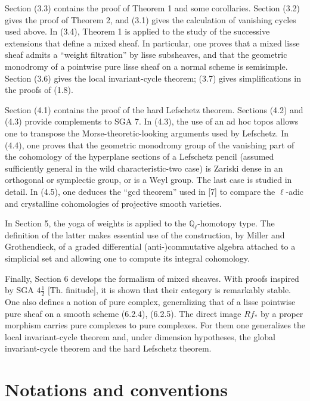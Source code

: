 \documentclass[11pt]{article}
\theoremstyle{remark}
\newcommand{\Ql}{\mathbb{Q}_\ell}
\begin{document}
Section (3.3) contains the proof of Theorem 1 and some corollaries. Section (3.2) gives the proof of Theorem 2, and (3.1) gives the calculation of vanishing cycles used above. In (3.4), Theorem 1 is applied to the study of the successive extensions that define a mixed sheaf. In particular, one proves that a mixed lisse sheaf admits a ``weight filtration'' by lisse subsheaves, and that the geometric monodromy of a pointwise pure lisse sheaf on a normal scheme is semisimple. Section (3.6) gives the local invariant-cycle theorem; (3.7) gives simplifications in the proofs of (1.8).

Section (4.1) contains the proof of the hard Lefschetz theorem. Sections (4.2) and (4.3) provide complements to SGA 7. In (4.3), the use of an ad hoc topos allows one to transpose the Morse-theoretic-looking arguments used by Lefschetz. In (4.4), one proves that the geometric monodromy group of the vanishing part of the cohomology of the hyperplane sections of a Lefschetz pencil (assumed sufficiently general in the wild characteristic-two case) is Zariski dense in an orthogonal or symplectic group, or is a Weyl group. The last case is studied in detail. In (4.5), one deduces the ``gcd theorem'' used in [7] to compare the $\ell$-adic and crystalline cohomologies of projective smooth varieties.

In Section 5, the yoga of weights is applied to the $\Ql$-homotopy type. The definition of the latter makes essential use of the construction, by Miller and Grothendieck, of a graded differential (anti-)commutative algebra attached to a simplicial set and allowing one to compute its integral cohomology.

Finally, Section 6 develops the formalism of mixed sheaves. With proofs inspired by SGA $4\frac12$ [Th. finitude], it is shown that their category is remarkably stable. One also defines a notion of pure complex, generalizing that of a lisse pointwise pure sheaf on a smooth scheme (6.2.4), (6.2.5). The direct image $Rf_*$ by a proper morphism carries pure complexes to pure complexes. For them one generalizes the local invariant-cycle theorem and, under dimension hypotheses, the global invariant-cycle theorem and the hard Lefschetz theorem.

\section*{Notations and conventions}
\end{document}
